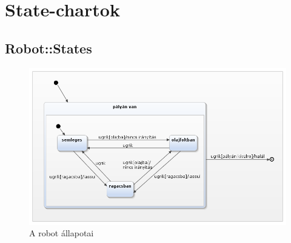 \section{State-chartok}

\subsection{Robot::States}
\begin{figure}[h]
\begin{center}
\includegraphics[width=17cm]{images/robot.png}
\caption{A robot állapotai}
\label{fig:example12}
\end{center}
\end{figure}